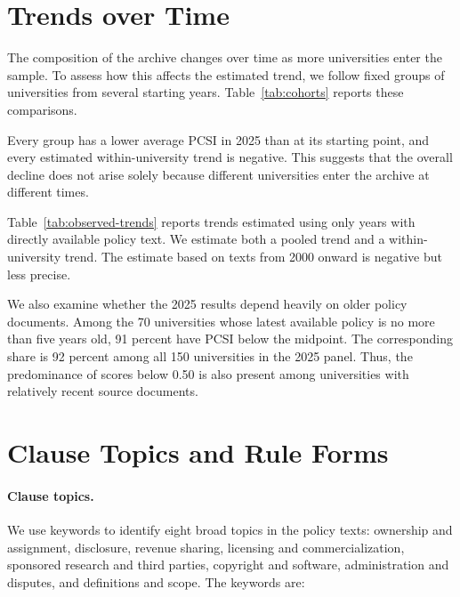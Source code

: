 \documentclass[11pt]{article}
\begin{document}


\section{Trends over Time}\label{app:temporal}
\setcounter{table}{0}

The composition of the archive changes over time as more universities enter the sample. To assess how this affects the estimated trend, we follow fixed groups of universities from several starting years. Table~\ref{tab:cohorts} reports these comparisons.

Every group has a lower average PCSI in 2025 than at its starting point, and every estimated within-university trend is negative. This suggests that the overall decline does not arise solely because different universities enter the archive at different times.



Table~\ref{tab:observed-trends} reports trends estimated using only years with directly available policy text. We estimate both a pooled trend and a within-university trend. The estimate based on texts from 2000 onward is negative but less precise.

We also examine whether the 2025 results depend heavily on older policy documents. Among the 70 universities whose latest available policy is no more than five years old, 91 percent have PCSI below the midpoint. The corresponding share is 92 percent among all 150 universities in the 2025 panel. Thus, the predominance of scores below 0.50 is also present among universities with relatively recent source documents.



\section{Clause Topics and Rule Forms}\label{app:topics}
\setcounter{table}{0}

\paragraph{Clause topics.}
We use keywords to identify eight broad topics in the policy texts: ownership and assignment, disclosure, revenue sharing, licensing and commercialization, sponsored research and third parties, copyright and software, administration and disputes, and definitions and scope. The keywords are:
\end{document}
